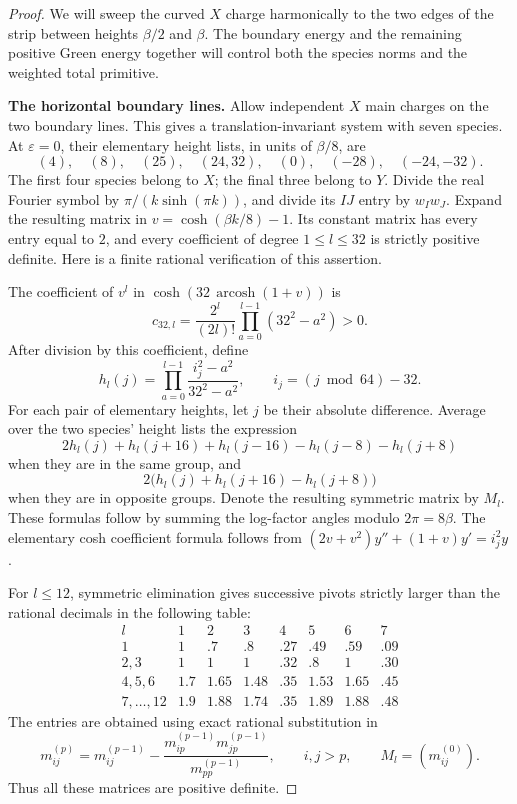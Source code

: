 \begin{proof}
We will sweep the curved \(X\) charge harmonically to the two edges
of the strip between heights \(\beta/2\) and \(\beta\).
The boundary energy and the remaining positive Green energy together
will control both the species norms and the weighted total primitive.

\par\smallskip\noindent\textbf{The horizontal boundary lines.}
Allow independent \(X\) main charges on the two boundary lines.
This gives a translation-invariant system with seven species.
At \(\varepsilon=0\), their elementary
height lists, in units of \(\beta/8\), are
\[
 (4),\quad(8),\quad(25),\quad(24,32),\quad
 (0),\quad(-28),\quad(-24,-32).
\]
The first four species belong to \(X\); the final three belong to
\(Y\).  Divide the real Fourier symbol by
\(\pi/(k\sinh(\pi k))\), and divide its \(IJ\) entry by
\(w_Iw_J\).  Expand the resulting matrix in
\(v=\cosh(\beta k/8)-1\).  Its constant matrix has every entry
equal to \(2\), and every coefficient of degree
\(1\le l\le32\) is strictly positive definite.
Here is a finite rational verification of this assertion.

The coefficient of \(v^l\) in \(\cosh(32\,\operatorname{arcosh}(1+v))\)
is
\[
 c_{32,l}=\frac{2^l}{(2l)!}
 \prod_{a=0}^{l-1}(32^2-a^2)>0.
\]
After division by this coefficient, define
\[
 h_l(j)=
 \prod_{a=0}^{l-1}\frac{i_j^2-a^2}{32^2-a^2},
 \qquad i_j=(j\bmod64)-32.
\]
For each pair of elementary heights, let \(j\) be their absolute
difference.  Average over the two species' height lists the
expression
\[
 2h_l(j)+h_l(j+16)+h_l(j-16)-h_l(j-8)-h_l(j+8)
\]
when they are in the same group, and
\[
 2\bigl(h_l(j)+h_l(j+16)-h_l(j+8)\bigr)
\]
when they are in opposite groups.  Denote the resulting symmetric
matrix by \(M_l\).
These formulas follow by summing the log-factor angles modulo
\(2\pi=8\beta\).  The elementary cosh coefficient formula follows
from
\((2v+v^2)y''+(1+v)y'=i_j^2y\).

For \(l\le12\), symmetric elimination gives successive pivots
strictly larger than the rational decimals in the following table:
\[
\begin{array}{c|rrrrrrr}
 l&1&2&3&4&5&6&7\\ \hline
 1&1&.7&.8&.27&.49&.59&.09\\
 2,3&1&1&1&.32&.8&1&.30\\
 4,5,6&1.7&1.65&1.48&.35&1.53&1.65&.45\\
 7,\ldots,12&1.9&1.88&1.74&.35&1.89&1.88&.48
\end{array}
\]
The entries are obtained using exact rational substitution in
\[
 m_{ij}^{(p)}
 =m_{ij}^{(p-1)}
 -\frac{m_{ip}^{(p-1)}m_{jp}^{(p-1)}}{m_{pp}^{(p-1)}},
 \qquad i,j>p,\qquad M_l=(m_{ij}^{(0)}).
\]
Thus all these matrices are positive definite.


\end{proof}

